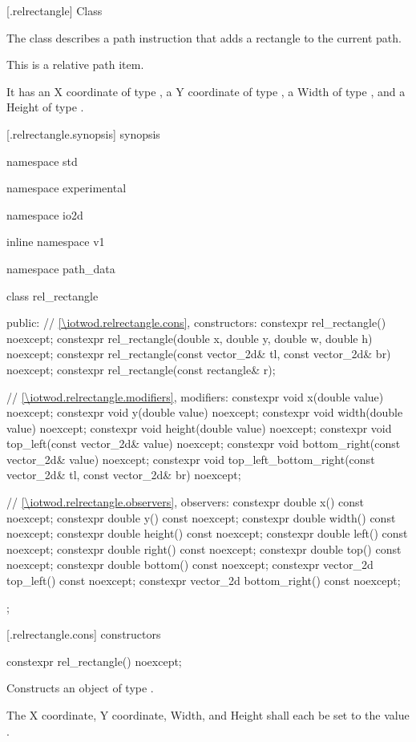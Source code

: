  [\iotwod.relrectangle] {Class }

\pnum
{}
The class  describes a path instruction that adds a rectangle to the current path.

\pnum
This is a relative path item.

\pnum
It has an X coordinate of type , a Y coordinate of type , a Width of type , and a Height of type .

 [\iotwod.relrectangle.synopsis] { synopsis}

\begin{codeblock}
namespace std { namespace experimental { namespace io2d { inline namespace v1 {
  namespace path_data {
    class rel_rectangle {
    public:
      // \ref{\iotwod.relrectangle.cons}, constructors:
      constexpr rel_rectangle() noexcept;
      constexpr rel_rectangle(double x, double y, double w, double h) noexcept;
      constexpr rel_rectangle(const vector_2d& tl, const vector_2d& br) 
        noexcept;
      constexpr rel_rectangle(const rectangle& r);

      // \ref{\iotwod.relrectangle.modifiers}, modifiers:
      constexpr void x(double value) noexcept;
      constexpr void y(double value) noexcept;
      constexpr void width(double value) noexcept;
      constexpr void height(double value) noexcept;
      constexpr void top_left(const vector_2d& value) noexcept;
      constexpr void bottom_right(const vector_2d& value) noexcept;
      constexpr void top_left_bottom_right(const vector_2d& tl,
        const vector_2d& br) noexcept;

      // \ref{\iotwod.relrectangle.observers}, observers:
      constexpr double x() const noexcept;
      constexpr double y() const noexcept;
      constexpr double width() const noexcept;
      constexpr double height() const noexcept;
      constexpr double left() const noexcept;
      constexpr double right() const noexcept;
      constexpr double top() const noexcept;
      constexpr double bottom() const noexcept;
      constexpr vector_2d top_left() const noexcept;
      constexpr vector_2d bottom_right() const noexcept;
    };
  }
} } } }
\end{codeblock}

 [\iotwod.relrectangle.cons] { constructors}

\begin{itemdecl}
constexpr rel_rectangle() noexcept;
\end{itemdecl}
\begin{itemdescr}
\pnum
\effects
Constructs an object of type .

\pnum
The X coordinate, Y coordinate, Width, and Height shall each be set to the value .
\end{itemdescr}

